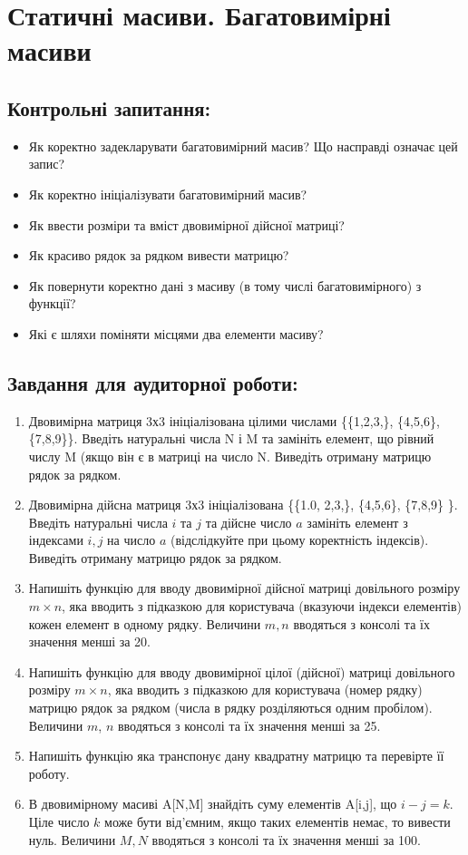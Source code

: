 \documentclass[a5paper,titlepage,openany,twoside,draft]{book_unv}%
\begin{document}
\chapter{ Статичні масиви. Багатовимірні масиви }
%

\section{Контрольні запитання:}
\begin{itemize}
\item
Як коректно задекларувати багатовимірний масив?
Що насправді означає цей запис?
\item
Як коректно ініціалізувати багатовимірний масив?
\item
  Як ввести розміри та вміст двовимірної
  дійсної матриці?
\item
 Як красиво рядок за рядком вивести матрицю?
\item
  Як повернути коректно дані з масиву 
(в тому числі багатовимірного) з функції?
\item
Які є шляхи поміняти місцями два елементи масиву? 
\end{itemize}

\section{Завдання для аудиторної роботи:}

\begin{enumerate}
\def\labelenumi{\arabic{enumi})}
\item
  Двовимірна матриця 3х3 ініціалізована цілими числами
  \{\{1,2,3,\}, \{4,5,6\}, \{7,8,9\}\}. Введіть
  натуральні числа N і M та замініть елемент, що рівний числу M (якщо
  він є в матриці на число N. Виведіть отриману матрицю рядок за
  рядком.
\item
  Двовимірна дійсна матриця 3х3 ініціалізована \{\{1.0,
  2,3,\}, \{4,5,6\}, \{7,8,9\} \}. Введіть
  натуральні числа $i$ та $j$ та дійсне число $a$ замініть елемент з індексами
  $i,j$ на число $a$ (відслідкуйте при цьому коректність індексів). Виведіть
  отриману матрицю рядок за рядком.
\item
  Напишіть функцію для вводу двовимірної дійсної матриці довільного
  розміру $m \times n$, яка вводить з підказкою для користувача (вказуючи
  індекси елементів) кожен елемент в одному рядку. Величини $m, n$
  вводяться з консолі та їх значення менші за 20.
\item
  Напишіть функцію для вводу двовимірної цілої (дійсної) матриці
  довільного розміру $m \times n$, яка вводить з підказкою для користувача
  (номер рядку) матрицю рядок за рядком (числа в рядку розділяються
  одним пробілом). Величини $m$, $n$ вводяться з консолі та їх значення
  менші за 25.
\item
 Напишіть функцію яка транспонує дану квадратну матрицю та перевірте її
роботу.
\item
  В двовимірному масиві A{[}N,M{]} знайдіть суму елементів A{[}i,j{]},
  що $i-j=k$. Ціле число $k$ може бути від'ємним, якщо таких елементів
  немає, то вивести нуль. Величини $M, N$ вводяться з консолі та їх
  значення менші за 100.
\end{enumerate}
\end{document}
